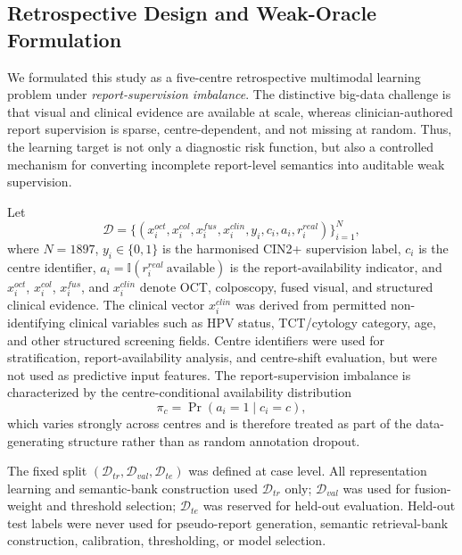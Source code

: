 \documentclass[11pt, a4paper]{article}
\theoremstyle{plain}
\theoremstyle{definition}
\begin{document}
\subsection{Retrospective Design and Weak-Oracle Formulation}
\label{subsec:methods_design}




We formulated this study as a five-centre retrospective multimodal learning problem under \emph{report-supervision imbalance}. The distinctive big-data challenge is that visual and clinical evidence are available at scale, whereas clinician-authored report supervision is sparse, centre-dependent, and not missing at random. Thus, the learning target is not only a diagnostic risk function, but also a controlled mechanism for converting incomplete report-level semantics into auditable weak supervision.

Let
\begin{equation}
\mathcal{D}=\{(x_i^{oct},x_i^{col},x_i^{fus},x_i^{clin},y_i,c_i,a_i,r_i^{real})\}_{i=1}^{N},
\end{equation}
where \(N=1897\), \(y_i\in\{0,1\}\) is the harmonised CIN2+ supervision label, \(c_i\) is the centre identifier, \(a_i=\mathbb{I}(r_i^{real}\ \mathrm{available})\) is the report-availability indicator, and \(x_i^{oct}\), \(x_i^{col}\), \(x_i^{fus}\), and \(x_i^{clin}\) denote OCT, colposcopy, fused visual, and structured clinical evidence. The clinical vector \(x_i^{clin}\) was derived from permitted non-identifying clinical variables such as HPV status, TCT/cytology category, age, and other structured screening fields. Centre identifiers were used for stratification, report-availability analysis, and centre-shift evaluation, but were not used as predictive input features. The report-supervision imbalance is characterized by the centre-conditional availability distribution
\begin{equation}
\pi_c=\Pr(a_i=1\mid c_i=c),
\end{equation}
which varies strongly across centres and is therefore treated as part of the data-generating structure rather than as random annotation dropout.

The fixed split \((\mathcal{D}_{tr},\mathcal{D}_{val},\mathcal{D}_{te})\) was defined at case level. All representation learning and semantic-bank construction used \(\mathcal{D}_{tr}\) only; \(\mathcal{D}_{val}\) was used for fusion-weight and threshold selection; \(\mathcal{D}_{te}\) was reserved for held-out evaluation. Held-out test labels were never used for pseudo-report generation, semantic retrieval-bank construction, calibration, thresholding, or model selection.
\end{document}
